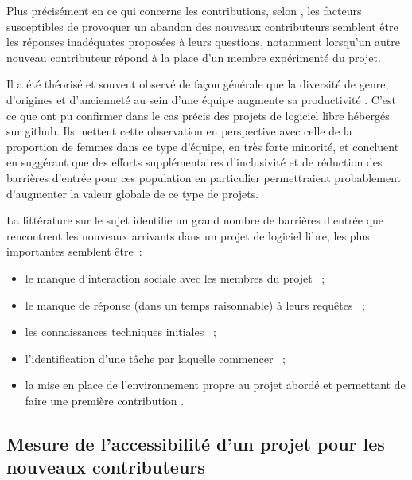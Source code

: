 Plus précisément en ce qui concerne les contributions, selon , les facteurs
susceptibles de provoquer un abandon des nouveaux contributeurs semblent être les réponses inadéquates
proposées à leurs questions, notamment lorsqu'un autre nouveau contributeur répond à la place d'un membre
expérimenté du projet.

Il a été théorisé et souvent observé de façon générale que la diversité de genre, d'origines et d'ancienneté
au sein d'une équipe augmente sa productivité . C'est ce
que  ont pu confirmer dans le cas précis des projets de logiciel libre hébergés
sur \gls{github}. Ils mettent cette observation en perspective avec celle de la proportion de femmes dans ce
type d'équipe, en très forte minorité, et concluent en suggérant que des efforts supplémentaires d'inclusivité
et de réduction des barrières d'entrée pour ces population en particulier permettraient probablement
d'augmenter la valeur globale de ce type de projets.

La littérature sur le sujet identifie un grand nombre de barrières d'entrée que rencontrent les nouveaux
arrivants dans un projet de logiciel libre, les plus importantes semblent être :

\begin{itemize}
    \item le manque d'interaction sociale avec les membres du projet
         ;
    \item le manque de réponse (dans un temps raisonnable) à leurs requêtes \parencite{barriers-meta-2015} ;
    \item les connaissances techniques initiales \parencite{barriers-meta-2015} ;
    \item l'identification d'une tâche par laquelle commencer  ;
    \item la mise en place de l'environnement propre au projet abordé et permettant de faire une première
        contribution .
\end{itemize}

\subsection{Mesure de l'accessibilité d'un projet pour les nouveaux contributeurs}
\label{sec:accessibility-measure}

